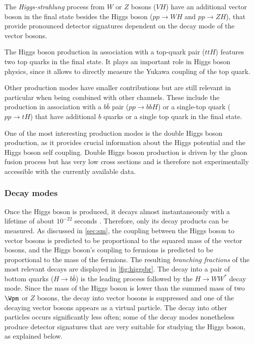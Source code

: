The \emph{Higgs-strahlung} process from $W$ or $Z$ bosons ($VH$) have an additional vector boson in the final state besides the Higgs boson ($pp \rightarrow WH$ and $pp \rightarrow ZH$), that provide pronounced detector signatures dependent on the decay mode of the vector bosons. 

The Higgs boson production in association with a top-quark pair ($ttH$) features two top quarks in the final state. It plays an important role in Higgs boson physics, since it allows to directly measure the Yukawa coupling of the top quark. 

Other production modes have smaller contributions but are still relevant in particular when being combined with other channels.
These include the production in association with a $b\bar{b}$ pair ($pp\rightarrow bbH$) or a single-top quark ($pp \rightarrow tH$) that have additional $b$ quarks or a single top quark in the final state. 

One of the most interesting production modes is the double Higgs boson production, as it provides crucial information about the Higgs potential and the Higgs boson self coupling. Double Higgs boson production is driven by the gluon fusion process but has very low cross sections and is therefore not experimentally accessible with the currently available data. 

\subsubsection{Decay modes}
Once the Higgs boson is produced, it decays almost instantaneously with a lifetime of about $10^{-22}$ seconds \cite{PDG2020}.
Therefore, only its decay products can be measured.
As discussed in \cref{sec:sm}, the coupling between the Higgs boson to vector bosons is predicted to be proportional to the squared mass of the vector bosons, and the Higgs boson's coupling to fermions is predicted to be proportional to the mass of the fermions. The resulting \emph{branching fractions} of the most relevant decays are displayed in \cref{fig:higgsbr}. 
The decay into a pair of bottom quarks ($H\rightarrow b\bar{b}$) is the leading process followed by the $H\rightarrow WW^*$ decay mode. Since the mass of the Higgs boson is lower than the summed mass of two $\Wpm$ or $Z$ bosons, the decay into vector bosons is suppressed and one of the decaying vector bosons appears as a virtual particle. The decay into other particles occurs significantly less often; some of the decay modes nonetheless produce detector signatures that are very suitable for studying the Higgs boson, as explained below.

